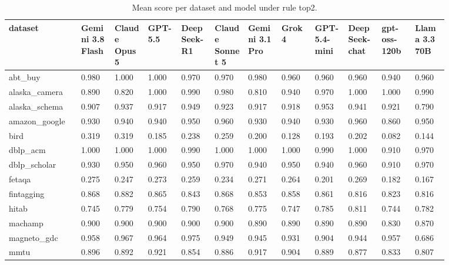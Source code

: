 \begin{landscape}
\tiny
\setlength{\tabcolsep}{3pt}
\begin{longtable}{p{0.134\linewidth}p{0.067\linewidth}p{0.067\linewidth}p{0.067\linewidth}p{0.067\linewidth}p{0.067\linewidth}p{0.067\linewidth}p{0.067\linewidth}p{0.067\linewidth}p{0.067\linewidth}p{0.067\linewidth}p{0.067\linewidth}}
\caption{Mean score per dataset and model under rule top2.}\label{tab:per_dataset_mean_top2}\\
\toprule
dataset & Gemini 3.8 Flash & Claude Opus 5 & GPT-5.5 & DeepSeek-R1 & Claude Sonnet 5 & Gemini 3.1 Pro & Grok 4 & GPT-5.4-mini & DeepSeek-chat & gpt-oss-120b & Llama 3.3 70B \\
\midrule
abt\_\allowbreak{}buy & 0.980 & 1.000 & 1.000 & 0.970 & 0.970 & 0.980 & 0.960 & 0.960 & 0.960 & 0.940 & 0.960 \\
alaska\_\allowbreak{}camera & 0.890 & 0.820 & 1.000 & 0.990 & 0.980 & 0.810 & 0.940 & 0.970 & 1.000 & 1.000 & 0.990 \\
alaska\_\allowbreak{}schema & 0.907 & 0.937 & 0.917 & 0.949 & 0.923 & 0.917 & 0.918 & 0.953 & 0.941 & 0.921 & 0.790 \\
amazon\_\allowbreak{}google & 0.930 & 0.940 & 0.940 & 0.950 & 0.960 & 0.930 & 0.940 & 0.930 & 0.960 & 0.860 & 0.950 \\
bird & 0.319 & 0.319 & 0.185 & 0.238 & 0.259 & 0.200 & 0.128 & 0.193 & 0.202 & 0.082 & 0.144 \\
dblp\_\allowbreak{}acm & 1.000 & 1.000 & 1.000 & 0.990 & 1.000 & 1.000 & 1.000 & 0.990 & 1.000 & 0.910 & 0.970 \\
dblp\_\allowbreak{}scholar & 0.930 & 0.950 & 0.960 & 0.950 & 0.970 & 0.940 & 0.950 & 0.940 & 0.960 & 0.910 & 0.970 \\
fetaqa & 0.275 & 0.247 & 0.273 & 0.259 & 0.234 & 0.271 & 0.264 & 0.201 & 0.269 & 0.182 & 0.167 \\
fintagging & 0.868 & 0.882 & 0.865 & 0.843 & 0.868 & 0.853 & 0.858 & 0.861 & 0.816 & 0.823 & 0.816 \\
hitab & 0.745 & 0.779 & 0.754 & 0.790 & 0.768 & 0.775 & 0.747 & 0.785 & 0.811 & 0.744 & 0.782 \\
machamp & 0.900 & 0.900 & 0.900 & 0.900 & 0.900 & 0.890 & 0.890 & 0.890 & 0.890 & 0.830 & 0.870 \\
magneto\_\allowbreak{}gdc & 0.958 & 0.967 & 0.964 & 0.975 & 0.949 & 0.945 & 0.931 & 0.904 & 0.944 & 0.957 & 0.686 \\
mmtu & 0.896 & 0.892 & 0.921 & 0.854 & 0.886 & 0.917 & 0.904 & 0.889 & 0.877 & 0.833 & 0.807 \\

\end{longtable}
\end{landscape}
